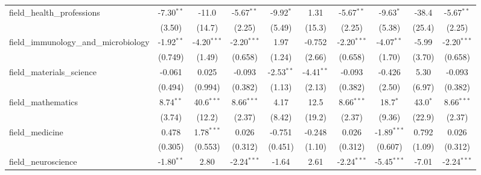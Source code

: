 \begin{tabular}{lccccccccc}
   field\_health\_professions                                  & -7.30$^{**}$   & -11.0          & -5.67$^{**}$  & -9.92$^{*}$    & 1.31           & -5.67$^{**}$  & -9.63$^{*}$   & -38.4         & -5.67$^{**}$\\   
                                                               & (3.50)         & (14.7)         & (2.25)        & (5.49)         & (15.3)         & (2.25)        & (5.38)        & (25.4)        & (2.25)\\   
   field\_immunology\_and\_microbiology                        & -1.92$^{**}$   & -4.20$^{***}$  & -2.20$^{***}$ & 1.97           & -0.752         & -2.20$^{***}$ & -4.07$^{**}$  & -5.99         & -2.20$^{***}$\\   
                                                               & (0.749)        & (1.49)         & (0.658)       & (1.24)         & (2.66)         & (0.658)       & (1.70)        & (3.70)        & (0.658)\\   
   field\_materials\_science                                   & -0.061         & 0.025          & -0.093        & -2.53$^{**}$   & -4.41$^{**}$   & -0.093        & -0.426        & 5.30          & -0.093\\   
                                                               & (0.494)        & (0.994)        & (0.382)       & (1.13)         & (2.13)         & (0.382)       & (2.50)        & (6.97)        & (0.382)\\   
   field\_mathematics                                          & 8.74$^{**}$    & 40.6$^{***}$   & 8.66$^{***}$  & 4.17           & 12.5           & 8.66$^{***}$  & 18.7$^{*}$    & 43.0$^{*}$    & 8.66$^{***}$\\   
                                                               & (3.74)         & (12.2)         & (2.37)        & (8.42)         & (19.2)         & (2.37)        & (9.36)        & (22.9)        & (2.37)\\   
   field\_medicine                                             & 0.478          & 1.78$^{***}$   & 0.026         & -0.751         & -0.248         & 0.026         & -1.89$^{***}$ & 0.792         & 0.026\\   
                                                               & (0.305)        & (0.553)        & (0.312)       & (0.451)        & (1.10)         & (0.312)       & (0.607)       & (1.09)        & (0.312)\\   
   field\_neuroscience                                         & -1.80$^{**}$   & 2.80           & -2.24$^{***}$ & -1.64          & 2.61           & -2.24$^{***}$ & -5.45$^{***}$ & -7.01         & -2.24$^{***}$\\   

\end{tabular}
